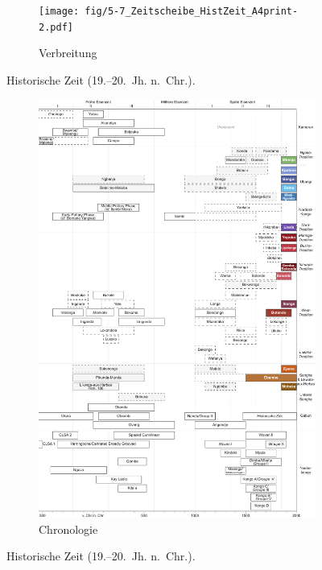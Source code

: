 \begin{figure}[p]
	\centering
	\begin{subfigure}[b]{\textwidth}
		\centering
		\texttt{[image: fig/5-7\_Zeitscheibe\_HistZeit\_A4print-2.pdf]}
		\vspace{4cm}
		\caption{Verbreitung}
		\label{fig:HistZeit_Karte}
	\end{subfigure}
	\caption{Historische Zeit (19.--20.~Jh. n.~Chr.).}
\end{figure}
\addtocounter{figure}{-1}
\begin{figure}[p]
	\begin{subfigure}[b]{\textwidth}
		\setcounter{subfigure}{1}
		\centering
		\includegraphics[height = .9\textheight]{fig/Chronologiesystem_v4_Zeitscheibe_HistZeit.pdf}
		\caption{Chronologie}
		\label{fig:HistZeit_Chronologie}
	\end{subfigure}
	\caption{Historische Zeit (19.--20.~Jh. n.~Chr.).}
	\label{fig:HistZeit}
\end{figure}

